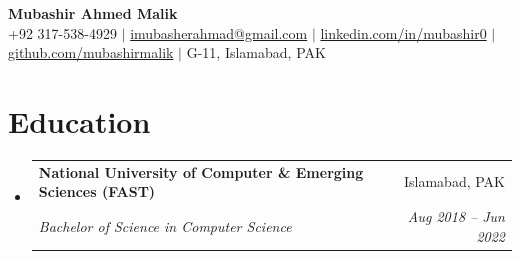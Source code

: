 \documentclass[letterpaper,11pt]{article}
\makeatletter
\newcommand{\resumeSubheading}[4]{
  \vspace{-2pt}\item
    \begin{tabular*}{0.97\textwidth}[t]{l@{\extracolsep{\fill}}r}
      \textbf{#1} & #2 \\
      \textit{\small#3} & \textit{\small #4} \\
    \end{tabular*}\vspace{-7pt}
}
\newcommand{\resumeSubHeadingListStart}{\begin{itemize}[leftmargin=0.15in, label={}]}
\newcommand{\resumeSubHeadingListEnd}{\end{itemize}}
\makeatother
\begin{document}

\begin{center}
    \textbf{\Huge Mubashir Ahmed Malik} \\ \vspace{1pt}
    \small
    +92 317-538-4929 $|$
    \href{mailto:imubasherahmad@gmail.com}{imubasherahmad@gmail.com} $|$
    \href{https://linkedin.com/in/mubashir0}{linkedin.com/in/mubashir0} $|$
    \href{https://github.com/mubashirmalik}{github.com/mubashirmalik} $|$
    G-11, Islamabad, PAK
    \vspace{0pt} %
\end{center}

\section{Education}
  \resumeSubHeadingListStart
    \resumeSubheading
      {National University of Computer \& Emerging Sciences (FAST)}{Islamabad, PAK}
      {Bachelor of Science in Computer Science}{Aug 2018 -- Jun 2022}
  \resumeSubHeadingListEnd
\end{document}
